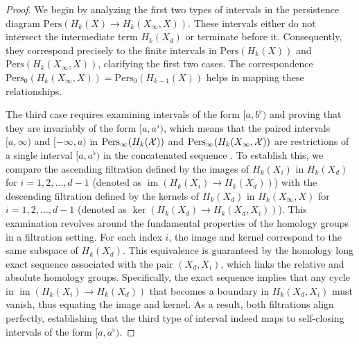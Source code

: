 \begin{proof}
	We begin by analyzing the first two types of intervals in the persistence diagram
	$\mathrm{Pers}(H_{k}(X) \to H_{k}(X_{\infty}, X))$. These intervals either do
	not intersect the intermediate term $H_{k}(X_{d})$ or terminate before it. Consequently,
	they correspond precisely to the finite intervals in $\mathrm{Pers}(H_{k}(X))$
	and $\mathrm{Pers}(H_{k}(X_{\infty}, X))$, clarifying the first two cases. The
	correspondence $\mathrm{Pers}_{0}(H_{k}(X_{\infty}, X)) = \mathrm{Pers}_{0}(H_{k-1}(X))$
	helps in mapping these relationships.

	The third case requires examining intervals of the form $[a, b^{\flat})$ and
	proving that they are invariably of the form $[a, a^{\flat})$, which means that
	the paired intervals $[a,\infty)$ and $[-\infty,a)$ in $\mathrm{Pers}_{\infty}(
	H_{k}({\mathcal{X}}))$ and $\mathrm{Pers}_{\infty}(H_{k}(X_{\infty}, {\mathcal{X}}))$ are restrictions
	of a single interval $[a,a^{\flat})$ in the concatenated sequence \cite[Proposition 2.5, proof]{de2011dualities}.
	To establish this, we compare the ascending filtration defined by the images of
	$H_{k}(X_{i})$ in $H_{k}(X_{d})$ for $i = 1, 2, \ldots, d-1$ (denoted as
	$\operatorname{im}(H_{k}(X_{i}) \to H_{k}(X_{d}))$) with the descending filtration defined
	by the kernels of $H_{k}(X_{d})$ in $H_{k}(X_{\infty}, X)$ for $i = 1, 2, \ldots
	, d-1$ (denoted as $\ker(H_{k}(X_{d}) \to H_{k}(X_{d}, X_{i}))$). This
	examination revolves around the fundamental properties of the homology groups
	in a filtration setting. For each index $i$, the image and kernel correspond to the same subspace of $H_{k}
	(X_{d})$. This equivalence is guaranteed by the homology long exact sequence
	associated with the pair $(X_{d}, X_{i})$, which links the relative and absolute
	homology groups. Specifically, the exact sequence implies that any cycle in $\operatorname{im}
	(H_{k}(X_{i}) \to H_{k}(X_{d}))$ that becomes a boundary in $H_{k}(X_{d}, X_{i}
	)$ must vanish, thus equating the image and kernel. As a result, both
	filtrations align perfectly, establishing that the third type of interval indeed
	maps to self-closing intervals of the form $[a, a^{\flat})$.
\end{proof}

